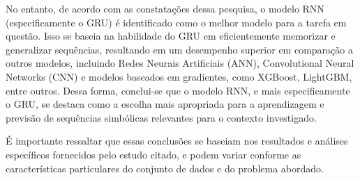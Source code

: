 No entanto, de acordo com as constatações dessa pesquisa, o modelo RNN (especificamente o GRU) é identificado como o melhor modelo para a tarefa em questão. Isso se baseia na habilidade do GRU em eficientemente memorizar e generalizar sequências, resultando em um desempenho superior em comparação a outros modelos, incluindo Redes Neurais Artificiais (ANN), Convolutional Neural Networks (CNN) e modelos baseados em gradientes, como XGBoost, LightGBM, entre outros. Dessa forma, conclui-se que o modelo RNN, e mais especificamente o GRU, se destaca como a escolha mais apropriada para a aprendizagem e previsão de sequências simbólicas relevantes para o contexto investigado.

É importante ressaltar que essas conclusões se baseiam nos resultados e análises específicos fornecidos pelo estudo citado, e podem variar conforme as características particulares do conjunto de dados e do problema abordado.
